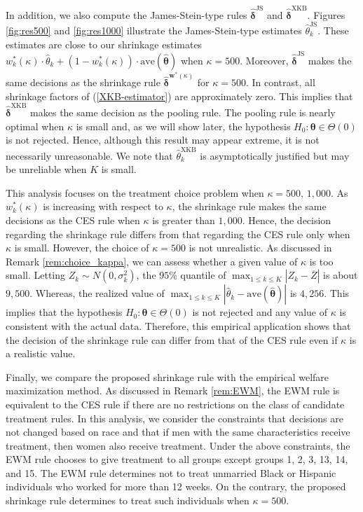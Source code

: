 \documentclass[12pt,a4paper]{article}
\begin{document}
In addition, we also compute the James-Stein-type rules $\hat{\bm{\delta}}^{\mathrm{JS}}$ and $\hat{\bm{\delta}}^{\mathrm{XKB}}$. Figures \ref{fig:res500} and \ref{fig:res1000} illustrate the James-Stein-type estimates $\hat{\theta}^{\mathrm{JS}}_k$. These estimates are close to our shrinkage estimates $w_k^{\ast}(\kappa) \cdot \hat{\theta}_k + (1-w_k^{\ast}(\kappa)) \cdot \text{ave}(\hat{\bm{\theta}})$ when $\kappa = 500$. Moreover, $\hat{\bm{\delta}}^{\mathrm{JS}}$ makes the same decisions as the shrinkage rule $\hat{\bm{\delta}}^{\bm{w}^{\ast}(\kappa)}$ for $\kappa = 500$. In contrast, all shrinkage factors of (\ref{XKB-estimator}) are approximately zero. This implies that $\hat{\bm{\delta}}^{\mathrm{XKB}}$ makes the same decision as the pooling rule. The pooling rule is nearly optimal when $\kappa$ is small and, as we will show later, the hypothesis $H_0:\bm{\theta} \in \Theta(0)$ is not rejected. Hence, although this result may appear extreme, it is not necessarily unreasonable. We note that $\hat{\theta}^{\mathrm{XKB}}_k$ is asymptotically justified but may be unreliable when $K$ is small.

This analysis focuses on the treatment choice problem when $\kappa = 500, \, 1{,}000$. As $w^{\ast}_k(\kappa)$ is increasing with respect to $\kappa$, the shrinkage rule makes the same decisions as the CES rule when $\kappa$ is greater than $1{,}000$. Hence, the decision regarding the shrinkage rule differs from that regarding the CES rule only when $\kappa$ is small. However, the choice of $\kappa = 500$ is not unrealistic. As discussed in Remark \ref{rem:choice_kappa}, we can assess whether a given value of $\kappa$ is too small. Letting $Z_k \sim N(0,\sigma_k^2)$, the $95 \%$ quantile of $\max_{1\leq k \leq K} |Z_k - \overline{Z}|$ is about $9{,}500$. Whereas, the realized value of $\max_{1 \leq k \leq K} \left| \hat{\theta}_k - \mathrm{ave}(\hat{\bm{\theta}}) \right|$ is $4{,}256$. This implies that the hypothesis $H_0:\bm{\theta} \in \Theta(0)$ is not rejected and any value of $\kappa$ is consistent with the actual data. Therefore, this empirical application shows that the decision of the shrinkage rule can differ from that of the CES rule even if $\kappa$ is a realistic value.

Finally, we compare the proposed shrinkage rule with the empirical welfare maximization method. As discussed in Remark \ref{rem:EWM}, the EWM rule is equivalent to the CES rule if there are no restrictions on the class of candidate treatment rules. In this analysis, we consider the constraints that decisions are not changed based on race and that if men with the same characteristics receive treatment, then women also receive treatment. Under the above constraints, the EWM rule chooses to give treatment to all groups except groups 1, 2, 3, 13, 14, and 15. The EWM rule determines not to treat unmarried Black or Hispanic individuals who worked for more than 12 weeks. On the contrary, the proposed shrinkage rule determines to treat such individuals when $\kappa=500$.
\end{document}
